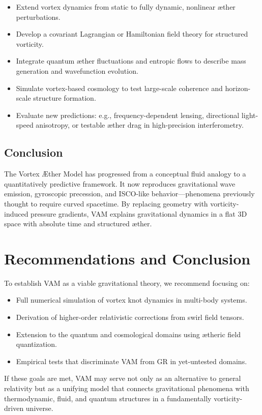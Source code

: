\begin{itemize}
    \item Extend vortex dynamics from static to fully dynamic, nonlinear æther perturbations.
    \item Develop a covariant Lagrangian or Hamiltonian field theory for structured vorticity.
    \item Integrate quantum æther fluctuations and entropic flows to describe mass generation and wavefunction evolution.
    \item Simulate vortex-based cosmology to test large-scale coherence and horizon-scale structure formation.
    \item Evaluate new predictions: e.g., frequency-dependent lensing, directional light-speed anisotropy, or testable æther drag in high-precision interferometry.
\end{itemize}

\subsection*{Conclusion}

The Vortex Æther Model has progressed from a conceptual fluid analogy to a quantitatively predictive framework. It now reproduces gravitational wave emission, gyroscopic precession, and ISCO-like behavior—phenomena previously thought to require curved spacetime. By replacing geometry with vorticity-induced pressure gradients, VAM explains gravitational dynamics in a flat 3D space with absolute time and structured æther.

\section{Recommendations and Conclusion}

To establish VAM as a viable gravitational theory, we recommend focusing on:
\begin{itemize}
    \item Full numerical simulation of vortex knot dynamics in multi-body systems.
    \item Derivation of higher-order relativistic corrections from swirl field tensors.
    \item Extension to the quantum and cosmological domains using ætheric field quantization.
    \item Empirical tests that discriminate VAM from GR in yet-untested domains.
\end{itemize}

If these goals are met, VAM may serve not only as an alternative to general relativity but as a unifying model that connects gravitational phenomena with thermodynamic, fluid, and quantum structures in a fundamentally vorticity-driven universe.

